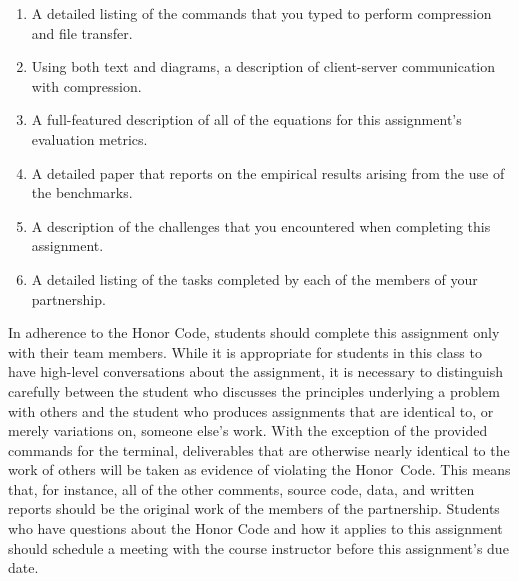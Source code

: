 \begin{enumerate}

    \item A detailed listing of the commands that you typed to perform compression and file transfer.

    \item Using both text and diagrams, a description of client-server communication with compression.

    \item A full-featured description of all of the equations for this assignment's evaluation metrics.

    \item A detailed paper that reports on the empirical results arising from the use of the benchmarks.

    \item A description of the challenges that you encountered when completing this assignment.

    \item A detailed listing of the tasks completed by each of the members of your partnership.

\end{enumerate}

In adherence to the Honor Code, students should complete this assignment only with their team members. While it is
appropriate for students in this class to have high-level conversations about the assignment, it is necessary to
distinguish carefully between the student who discusses the principles underlying a problem with others and the student
who produces assignments that are identical to, or merely variations on, someone else's work.  With the exception of the
provided commands for the terminal, deliverables that are otherwise nearly identical to the work of others will be taken
as evidence of violating the \mbox{Honor Code}. This means that, for instance, all of the other comments, source code,
data, and written reports should be the original work of the members of the partnership. Students who have questions
about the Honor Code and how it applies to this assignment should schedule a meeting with the course instructor before
this assignment's due date.


